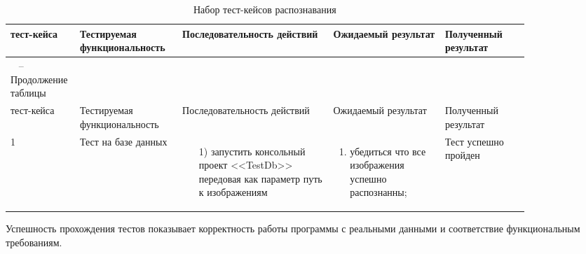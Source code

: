 \begin{longtable}{| >{\raggedright}m{0.06\linewidth} 
                  | >{\raggedright}m{0.18\linewidth} 
                  | >{\raggedright}m{0.27\linewidth} 
                  | >{\raggedright}m{0.2\linewidth} 
                  | >{\raggedright\arraybackslash}m{0.15\linewidth}|}
	\caption{Набор тест-кейсов распознавания}
	\label{table:testing:dashboard_constructing} \\

   \hline
   \No{} тест-кейса & Тестируемая функциональность & Последовательность действий & Ожидаемый результат & Полученный результат\\
   \endfirsthead

	\multicolumn{3}{c}%
	{{ \raggedleft \tablename\ \thetable{} -- Продолжение таблицы}} \\

	\hline
   	\No{} тест-кейса & Тестируемая функциональность & Последовательность действий & Ожидаемый результат & Полученный результат\\

	\hline 
	\endhead

	\hline
	1 & Тест на базе данных & 
   			\begin{enumerate}
				\item[1)] запустить консольный проект <<TestDb>> передовая как параметр путь к изображениям
			\end{enumerate}
   			& 
   			\begin{enumerate}
   				\item убедиться что все изображения успешно распознанны;
   			\end{enumerate}
   			& Тест успешно пройден \\
	\hline
\end{longtable}

Успешность прохождения тестов показывает корректность работы программы с реальными данными и соответствие функциональным требованиям.
